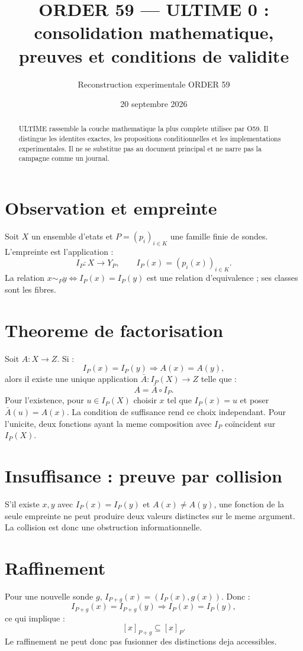 \documentclass[11pt,a4paper]{article}
\title{ORDER 59 --- ULTIME 0 : consolidation mathematique, preuves et conditions de validite}
\author{Reconstruction experimentale ORDER 59}
\date{20 septembre 2026}
\begin{document}
\maketitle
\tableofcontents
\newpage

\begin{abstract}
ULTIME rassemble la couche mathematique la plus complete utilisee par O59. Il distingue les identites exactes, les propositions conditionnelles et les implementations experimentales. Il ne se substitue pas au document principal et ne narre pas la campagne comme un journal.
\end{abstract}

\section{Observation et empreinte}
Soit $X$ un ensemble d'etats et $P=(p_i)_{i\in K}$ une famille finie de sondes. L'empreinte est l'application :
\[
I_P:X\to Y_P,\qquad I_P(x)=(p_i(x))_{i\in K}.
\]
La relation $x\sim_Py\Leftrightarrow I_P(x)=I_P(y)$ est une relation d'equivalence ; ses classes sont les fibres.

\section{Theoreme de factorisation}
Soit $A:X\to Z$. Si :
\[
I_P(x)=I_P(y)\Rightarrow A(x)=A(y),
\]
alors il existe une unique application $\bar A:I_P(X)\to Z$ telle que :
\[
A=\bar A\circ I_P.
\]
Pour l'existence, pour $u\in I_P(X)$ choisir $x$ tel que $I_P(x)=u$ et poser $\bar A(u)=A(x)$. La condition de suffisance rend ce choix independant. Pour l'unicite, deux fonctions ayant la meme composition avec $I_P$ coïncident sur $I_P(X)$.

\section{Insuffisance : preuve par collision}
S'il existe $x,y$ avec $I_P(x)=I_P(y)$ et $A(x)\neq A(y)$, une fonction de la seule empreinte ne peut produire deux valeurs distinctes sur le meme argument. La collision est donc une obstruction informationnelle.

\section{Raffinement}
Pour une nouvelle sonde $g$, $I_{P+g}(x)=(I_P(x),g(x))$. Donc :
\[
I_{P+g}(x)=I_{P+g}(y)\Rightarrow I_P(x)=I_P(y),
\]
ce qui implique :
\[
[x]_{P+g}\subseteq[x]_P.
\]
Le raffinement ne peut donc pas fusionner des distinctions deja accessibles.
\end{document}
